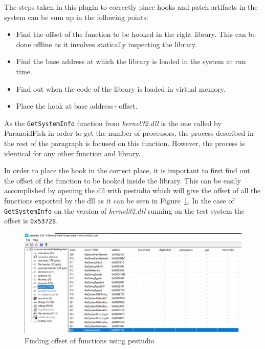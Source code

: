 The steps taken in this plugin to correctly place hooks and patch artifacts in the system can be sum up in the following points:

\begin{itemize}
    \item Find the offset of the function to be hooked in the right library. This can be done offline as it involves statically inspecting the library.
    \item Find the base address at which the library is loaded in the system at run time.
    \item Find out when the code of the library is loaded in virtual memory.
    \item Place the hook at base address+offset.
\end{itemize}

As the \lstinline{GetSystemInfo} function from \textit{kernel32.dll} is the one called by ParanoidFish in order to get the number of processors, the process described in the rest of the paragraph is focused on this function. However, the process is identical for any other function and library.

In order to place the hook in the correct place, it is important to first find out the offset of the function to be hooked inside the library. This can be easily accomplished by opening the dll with pestudio which will give the offset of all the functions exported by the dll as it can be seen in Figure~\ref{fig:pestudio}. In the case of \lstinline{GetSystemInfo} on the version of \textit{kernel32.dll} running on the test system the offset is \lstinline{0x53728}.

\noindent
\begin{figure}[htp]
\centering
\includegraphics[width=\linewidth]{images/pestudio.png}
\caption{Finding offset of functions using pestudio}
\label{fig:pestudio}
\end{figure}


